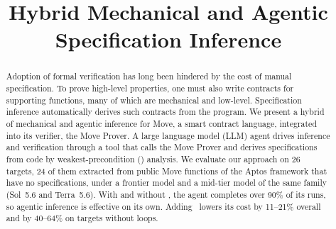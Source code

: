 %

\usepackage[utf8]{inputenc}






\title{Hybrid Mechanical and Agentic\texorpdfstring{\\}{} Specification Inference}




\maketitle

\begin{abstract}
Adoption of formal verification has long been hindered by the cost of manual specification.
To prove high-level properties, one must also write contracts for supporting functions, many of which are mechanical and low-level.
Specification inference automatically derives such contracts from the program.
We present a hybrid of mechanical and agentic inference for Move, a smart contract language, integrated into its verifier, the Move Prover.
A large language model (LLM) agent drives inference and verification through a tool that calls the Move Prover and derives specifications from code by weakest-precondition (\WP) analysis.
We evaluate our approach on 26 targets, 24 of them extracted from public Move functions of the Aptos framework that have no specifications, under a frontier model and a mid-tier model of the same family (Sol~5.6 and Terra~5.6).
With and without \WP, the agent completes over 90\% of its runs, so agentic inference is effective on its own.
Adding \WP\ lowers its cost by 11--21\% overall and by 40--64\% on targets without loops.

\end{abstract}

